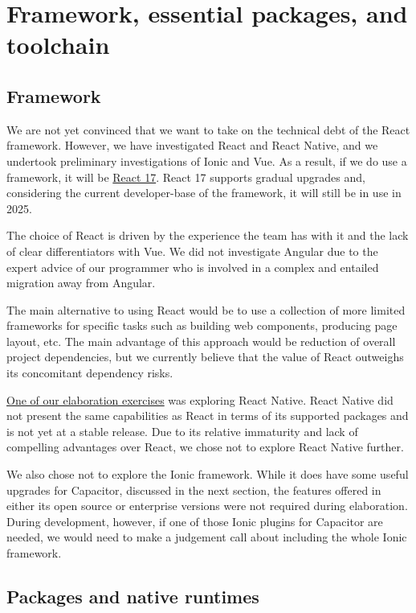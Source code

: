 \documentclass{faims3_report}
\begin{document}
\section{Framework, essential packages, and
toolchain}

\subsection{Framework}

We are not yet convinced that we want to take on the technical debt of
the React framework. However, we have investigated React and React
Native, and we undertook preliminary investigations of Ionic and Vue. As
a result, if we do use a framework, it will be
\href{https://reactjs.org/docs/faq-versioning.html}{{React 17}}. React
17 supports gradual upgrades and, considering the current developer-base
of the framework, it will still be in use in 2025.

The choice of React is driven by the experience the team has with it and
the lack of clear differentiators with Vue. We did not investigate
Angular due to the expert advice of our programmer who is involved in a
complex and entailed migration away from Angular.

The main alternative to using React would be to use a collection of more
limited frameworks for specific tasks such as building web components,
producing page layout, etc. The main advantage of this approach would be
reduction of overall project dependencies, but we currently believe that
the value of React outweighs its concomitant dependency risks.

\href{https://github.com/FAIMS/faims3reactnative}{{One of our
elaboration exercises}} was exploring React Native. React Native did not
present the same capabilities as React in terms of its supported
packages and is not yet at a stable release. Due to its relative
immaturity and lack of compelling advantages over React, we chose not to
explore React Native further.

We also chose not to explore the Ionic framework. While it does have
some useful upgrades for Capacitor, discussed in the next section, the
features offered in either its open source or enterprise versions were
not required during elaboration. During development, however, if one of
those Ionic plugins for Capacitor are needed, we would need to make a
judgement call about including the whole Ionic framework.

\subsection{Packages and native
runtimes}
\end{document}
